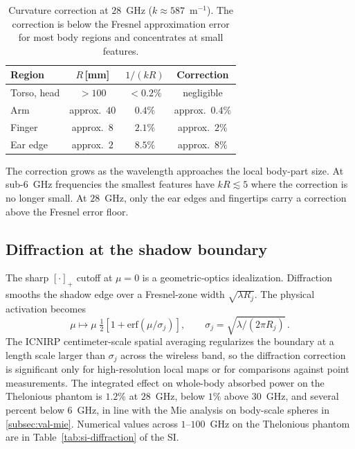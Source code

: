 \documentclass[journal,twocolumn,10pt]{IEEEtran}
\theoremstyle{plain}
\theoremstyle{remark}
\begin{document}
\begin{table}[!t]
\centering
\caption{Curvature correction at $28$~GHz ($k \approx 587$~m$^{-1}$).
The correction is below the Fresnel approximation error for most
body regions and concentrates at small features.}
\label{tab:curv-mag}
\begin{tabular}{lccc}
\toprule
Region & $R$\,[mm] & $1/(kR)$ & Correction \\
\midrule
Torso, head & $> 100$ & $< 0.2\%$ & negligible \\
Arm         & approx.\ $40$ & $0.4\%$ & approx.\ $0.4\%$ \\
Finger      & approx.\ $8$  & $2.1\%$ & approx.\ $2\%$ \\
Ear edge    & approx.\ $2$  & $8.5\%$ & approx.\ $8\%$ \\
\bottomrule
\end{tabular}
\end{table}

The correction grows as the wavelength approaches the local
body-part size. At sub-$6$~GHz frequencies the smallest features
have $kR \lesssim 5$ where the correction is no longer small. At
$28$~GHz, only the ear edges and fingertips carry a correction
above the Fresnel error floor.

\subsection{Diffraction at the shadow boundary}\label{subsec:corr-diff}
The sharp $[\cdot]_+$ cutoff at $\mu = 0$ is a geometric-optics
idealization. Diffraction smooths the shadow edge over a Fresnel-zone
width $\sqrt{\lambda R_j}$. The physical activation becomes
\begin{equation}\label{eq:gelu}
  \mu \mapsto \mu\;\tfrac{1}{2}\!\left[1 + \mathrm{erf}(\mu/\sigma_j)\right],
  \qquad \sigma_j = \sqrt{\lambda / (2\pi R_j)}\, .
\end{equation}
The \gls{ICNIRP} centimeter-scale spatial
averaging regularizes the boundary at a length scale larger
than $\sigma_j$ across the wireless band, so the diffraction
correction is significant only for high-resolution local maps or
for comparisons against point measurements. The integrated effect on
whole-body absorbed power on the Thelonious phantom is $1.2\%$ at
$28$~GHz, below $1\%$ above $30$~GHz, and several percent below
$6$~GHz, in line with the Mie analysis on body-scale spheres in
\cref{subsec:val-mie}. Numerical values across $1$--$100$~GHz on
the Thelonious phantom are in Table~\ref{tab:si-diffraction} of the SI.
\end{document}

